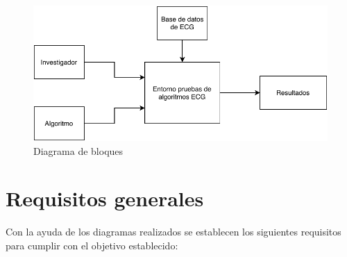     \begin{figure}[H]  
        \centering
            \includegraphics[width =\linewidth]{figuras/BlocksDiagram.pdf}
        \caption{Diagrama de bloques}
        \label{fig:BlocksDiagram}
    \end{figure}
    \clearpage


\section{Requisitos generales}

    Con la ayuda de los diagramas realizados se establecen los siguientes requisitos para cumplir con el objetivo establecido:
     
